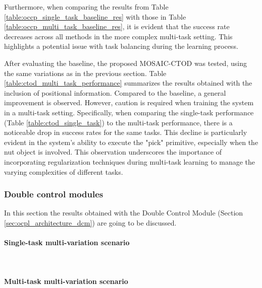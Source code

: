 Furthermore, when comparing the results from Table \ref{table:occp_single_task_baseline_res} with those in Table \ref{table:occp_multi_task_baseline_res}, it is evident that the success rate decreases across all methods in the more complex multi-task setting. This highlights a potential issue with task balancing during the learning process.


After evaluating the baseline, the proposed MOSAIC-CTOD was tested, using the same variations as in the previous section. Table \ref{table:ctod_multi_task_performance} summarizes the results obtained with the inclusion of positional information. Compared to the baseline, a general improvement is observed. However, caution is required when training the system in a multi-task setting. Specifically, when comparing the single-task performance (Table \ref{table:ctod_single_task}) to the multi-task performance, there is a noticeable drop in success rates for the same tasks. This decline is particularly evident in the system's ability to execute the "pick" primitive, especially when the nut object is involved. This observation underscores the importance of incorporating regularization techniques during multi-task learning to manage the varying complexities of different tasks.


\subsubsection{Double control modules}
In this section the results obtained with the Double Control Module (Section \ref{sec:ocpl_architecture_dcm}) are going to be discussed.  
\label{sec:ocpl_results_dcm}
\paragraph*{Single-task multi-variation scenario}\mbox{}\\
\paragraph*{Multi-task multi-variation scenario}\mbox{}\\